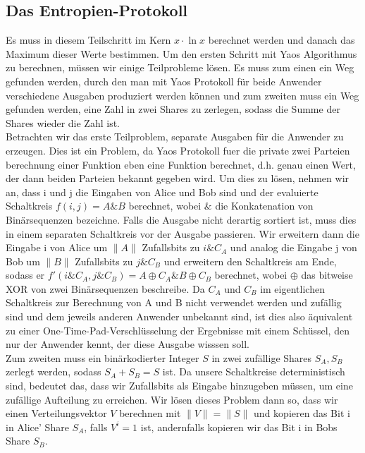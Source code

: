 \documentclass{article}
\begin{document}
\subsection{Das Entropien-Protokoll}
Es muss in diesem Teilschritt im Kern \(x\cdot \ln x\) berechnet werden und
danach das Maximum dieser Werte bestimmen.
Um den ersten Schritt mit Yaos Algorithmus zu berechnen, m\"ussen
wir einige Teilprobleme l\"osen. Es muss zum einen ein Weg gefunden
werden, durch den man mit Yaos Protokoll f\"ur beide Anwender
verschiedene Ausgaben produziert werden k\"onnen und zum zweiten muss
ein Weg gefunden werden, eine Zahl in zwei Shares zu zerlegen, sodass die
Summe der Shares wieder die Zahl ist.\\
Betrachten wir das erste Teilproblem, separate Ausgaben f\"ur die Anwender
zu erzeugen. Dies ist ein Problem, da Yaos Protokoll fuer die private 
zwei Parteien berechnung einer Funktion eben eine Funktion berechnet, d.h.
genau einen Wert, der dann beiden Parteien bekannt gegeben wird. 
Um dies zu l\"osen, nehmen wir an, dass i und j die Eingaben von Alice
und Bob sind und der evaluierte Schaltkreis \(f(i, j) = A \& B\) berechnet,
wobei \(\&\) die Konkatenation von Bin\"arsequenzen bezeichne.
Falls die Ausgabe nicht derartig sortiert ist, muss dies in einem separaten
Schaltkreis vor der Ausgabe passieren. Wir erweitern dann die Eingabe i
von Alice um \(\|A\|\) Zufallsbits zu \(i \& C_A\) und analog die Eingabe
j von Bob um \(\|B\|\) Zufallsbits zu \(j \& C_B\) und erweitern den 
Schaltkreis am Ende, sodass er 
\(f'(i\&C_A, j\&C_B) = A \oplus C_A \& B \oplus C_B\) berechnet, wobei
\(\oplus\) das bitweise XOR von zwei Bin\"arsequenzen beschreibe. Da \(C_A\)
und \(C_B\) im eigentlichen Schaltkreis zur Berechnung von A und B nicht
verwendet werden und zuf\"allig sind und dem jeweils anderen Anwender 
unbekannt sind, ist dies also \"aquivalent zu einer 
One-Time-Pad-Verschl\"usselung der Ergebnisse mit einem Sch\"ussel, den
nur der Anwender kennt, der diese Ausgabe wisssen soll.\\
Zum zweiten muss ein bin\"arkodierter Integer \(S\) in zwei zuf\"allige Shares 
\(S_A, S_B\) zerlegt werden, sodass \(S_A + S_B = S\) ist. Da unsere
Schaltkreise deterministisch sind, bedeutet das, dass wir Zufallsbits als 
Eingabe hinzugeben m\"ussen, um eine zuf\"allige Aufteilung zu erreichen.
Wir l\"osen dieses Problem dann so, dass wir einen Verteilungsvektor \(V\)
berechnen mit \(\|V\| = \|S\|\) und kopieren das Bit i in Alice' Share \(S_A\),
falls \(V^i = 1\) ist, andernfalls kopieren wir das Bit i in Bobs Share \(S_B\).
\end{document}
